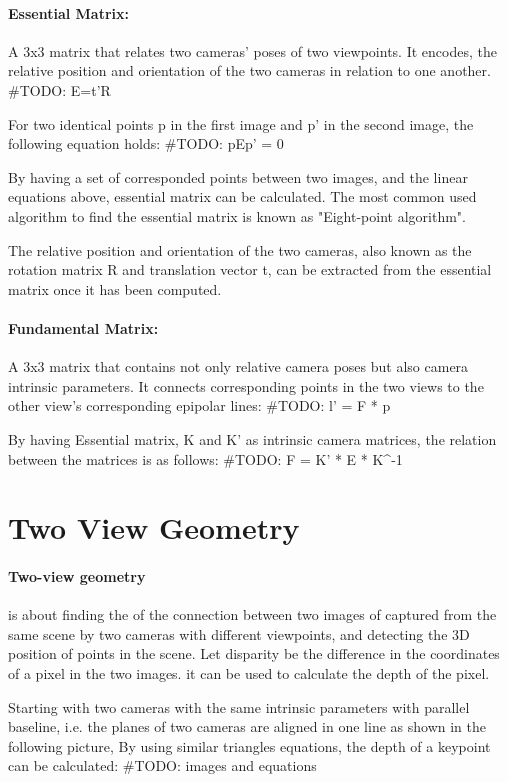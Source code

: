\documentclass[11pt]{article}
\begin{document}
    \paragraph{Essential Matrix:} A 3x3 matrix that relates two cameras' poses of two viewpoints. It encodes,
    the relative position and orientation of the two cameras in relation to one another.
    #TODO: E=t'R

    For two identical points p in the first image and p' in the second image, the following equation holds:
    #TODO: pEp' = 0

    By having a set of corresponded points between two images, and the linear equations above, essential matrix
    can be calculated. The most common used algorithm to find the essential matrix is known as "Eight-point algorithm".

    The relative position and orientation of the two cameras, also known as the rotation matrix R and translation
    vector t, can be extracted from the essential matrix once it has been computed.
    
    \paragraph{Fundamental Matrix:} A 3x3 matrix that contains not only relative camera poses but also
    camera intrinsic parameters. It connects corresponding points in the two views to the other view's
    corresponding epipolar lines:
    #TODO: l' = F * p


    By having Essential matrix, K and K' as intrinsic camera matrices, the relation between the matrices is as follows:
    #TODO: F = K' * E * K^-1

    \section{Two View Geometry}

    \paragraph{Two-view geometry} is about finding the of the connection between two images of captured from the same scene
    by two cameras with different viewpoints, and detecting the 3D position of points in the scene.
    Let disparity be the difference in the coordinates of a pixel in the two images. it can be used to calculate
    the depth of the pixel.

    Starting with two cameras with the same intrinsic parameters with parallel baseline, i.e. the planes of
    two cameras are aligned in one line as shown in the following picture, By using similar triangles equations,
    the depth of a keypoint can be calculated:
    #TODO: images and equations
\end{document}
